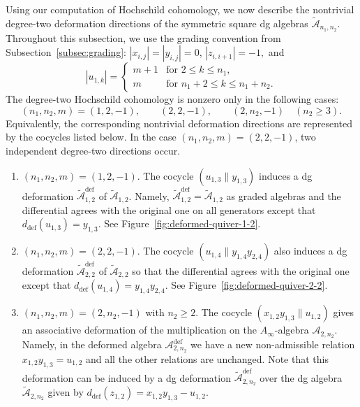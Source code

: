 \documentclass[a4paper, reqno, 11pt]{amsart}
\theoremstyle{definition}
\begin{document}
Using our computation of Hochschild cohomology, we now describe the nontrivial degree-two deformation directions of the symmetric square dg algebras \(\widetilde{\mathcal A}_{n_1,n_2}\). Throughout this subsection, we use the grading convention from Subsection~\ref{subsec:grading}:
\(|x_{i,j}|=|y_{i,j}|=0\), \(|z_{i,i+1}|=-1,\)
and
\[
|u_{1,k}|= \begin{cases}
	m+1 & \text{for $2\leq k\leq n_1$},\\ 
	m & \text{for $n_1+2\leq k\leq n_1+n_2$}.
\end{cases}
\]
The degree-two Hochschild cohomology is nonzero only in the following cases:
\[
(n_1,n_2,m)=(1,2,-1),\qquad (2,2,-1),\qquad (2,n_2,-1)\quad (n_2\geq 3).
\]
Equivalently, the corresponding nontrivial deformation directions are represented by the cocycles listed below. In the case \((n_1,n_2,m)=(2,2,-1)\), two independent degree-two directions occur.

\begin{enumerate}[label=(\arabic*), leftmargin=*]
	\item \((n_1,n_2,m)=(1,2,-1)\). The cocycle $(u_{1,3}\parallel y_{1,3})$ induces a dg deformation \(\widetilde{\mathcal A}_{1,2}^{\mathrm{def}}\)  of \(\widetilde{\mathcal A}_{1,2}\). Namely, \(\widetilde{\mathcal A}_{1,2}^{\mathrm{def}} =\widetilde{\mathcal A}_{1,2}\) as graded algebras and the differential agrees with the original one on all generators except that \(d_{\mathrm{def}}(u_{1,3})=y_{1,3}.\)
	See Figure~\ref{fig:deformed-quiver-1-2}.
	
	\item \((n_1,n_2,m)=(2,2,-1)\). The cocycle $(u_{1,4}\parallel y_{1,4}y_{2,4})$ also induces a dg deformation  \(\widetilde{\mathcal A}_{2,2}^{\mathrm{def}}\) of  \(\widetilde{\mathcal A}_{2,2}\) so that the differential agrees with the original one except that \(d_{\mathrm{def}}(u_{1,4})=y_{1,4}y_{2,4}.\)
	See Figure~\ref{fig:deformed-quiver-2-2}.
	
	
	\item \((n_1,n_2,m)=(2,n_2,-1)\) with \(n_2\geq 2\). The cocycle $(x_{1,2}y_{1,3}\parallel u_{1,2})$ gives an associative deformation of the multiplication on the $A_\infty$-algebra $\mathcal A_{2, n_2}$. Namely, in the deformed algebra $\mathcal A_{2, n_2}^{\mathrm{def}}$ we have a new non-admissible relation $x_{1,2} y_{1,3}=u_{1,2}$ and all the other relations are unchanged.  Note that this deformation can be induced by a dg deformation   \(\widetilde{\mathcal A}_{2,n_2}^{\mathrm{def}}\) over the dg algebra \(\widetilde{\mathcal A}_{2,n_2}\) given by \(d_{\mathrm{def}}(z_{1,2}) = x_{1,2} y_{1,3} - u_{1,2}.\) %
\end{enumerate}
\end{document}
